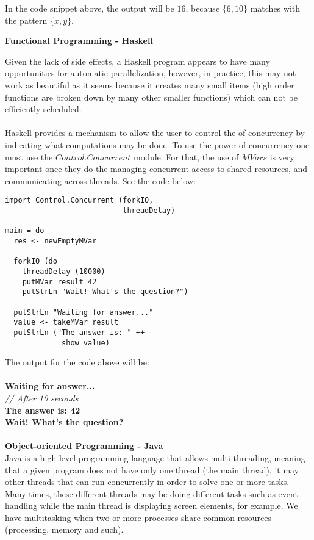 \documentclass[conference]{IEEEtran}
\begin{document}
In the code snippet above, the output will be $16$, because $\{6, 10\}$ matches with the pattern $\{x,y\}$.

\hfill

\textbf{ Functional Programming - Haskell }

Given the lack of side effects, a Haskell program appears to have many opportunities for automatic
parallelization, however, in practice, this may not work as beautiful as it seems because it creates many small items (high order functions are broken down by many other smaller functions) which can not be efficiently scheduled.
\\\\
Haskell provides a mechanism to allow the user to control the of concurrency by indicating what computations may be done. To use the power of concurrency one must use the $Control.Concurrent$ module. For that, the use of $MVars$ is very important once they do the managing concurrent access to shared resources, and communicating across threads. See the code below:
\lstset{language=haskell}
\begin{lstlisting}[frame=single]
import Control.Concurrent (forkIO,
                           threadDelay)

main = do
  res <- newEmptyMVar

  forkIO (do
    threadDelay (10000)
    putMVar result 42
    putStrLn "Wait! What's the question?")

  putStrLn "Waiting for answer..."
  value <- takeMVar result
  putStrLn ("The answer is: " ++
             show value)
\end{lstlisting}

The output for the code above will be:
\\\\
\textbf{Waiting for answer...}\\
\textit{// After 10 seconds }\\
\textbf{The answer is: 42}\\
\textbf{Wait! What's the question?}\\\\

\textbf{ Object-oriented Programming - Java }\\
Java is a high-level programming language that allows multi-threading, meaning that a given program does not have only one thread (the main thread), it may other threads that can run concurrently in order to solve one or more tasks. Many times, these different threads may be doing different tasks such as event-handling while the main thread is displaying screen elements, for example. We have multitasking when two or more processes share common resources (processing, memory and such).\\\\
\end{document}
